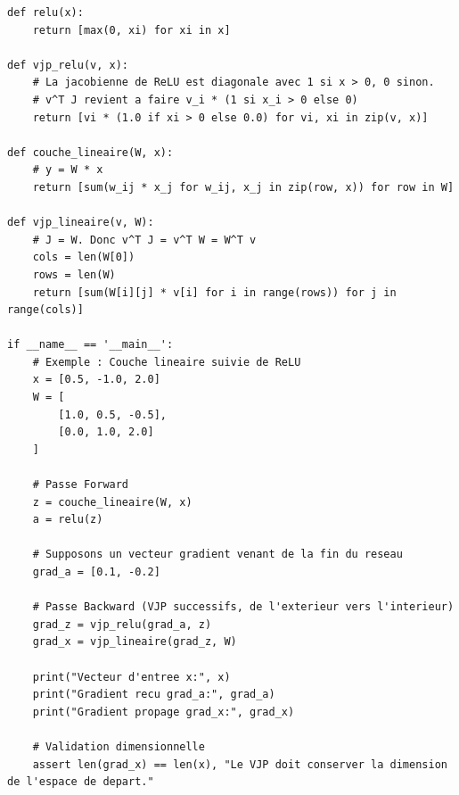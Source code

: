 \documentclass[11pt,a4paper]{article}
\begin{document}
\begin{lstlisting}
def relu(x):
    return [max(0, xi) for xi in x]

def vjp_relu(v, x):
    # La jacobienne de ReLU est diagonale avec 1 si x > 0, 0 sinon.
    # v^T J revient a faire v_i * (1 si x_i > 0 else 0)
    return [vi * (1.0 if xi > 0 else 0.0) for vi, xi in zip(v, x)]

def couche_lineaire(W, x):
    # y = W * x
    return [sum(w_ij * x_j for w_ij, x_j in zip(row, x)) for row in W]

def vjp_lineaire(v, W):
    # J = W. Donc v^T J = v^T W = W^T v
    cols = len(W[0])
    rows = len(W)
    return [sum(W[i][j] * v[i] for i in range(rows)) for j in range(cols)]

if __name__ == '__main__':
    # Exemple : Couche lineaire suivie de ReLU
    x = [0.5, -1.0, 2.0]
    W = [
        [1.0, 0.5, -0.5],
        [0.0, 1.0, 2.0]
    ]

    # Passe Forward
    z = couche_lineaire(W, x)
    a = relu(z)

    # Supposons un vecteur gradient venant de la fin du reseau
    grad_a = [0.1, -0.2]

    # Passe Backward (VJP successifs, de l'exterieur vers l'interieur)
    grad_z = vjp_relu(grad_a, z)
    grad_x = vjp_lineaire(grad_z, W)

    print("Vecteur d'entree x:", x)
    print("Gradient recu grad_a:", grad_a)
    print("Gradient propage grad_x:", grad_x)

    # Validation dimensionnelle
    assert len(grad_x) == len(x), "Le VJP doit conserver la dimension de l'espace de depart."
\end{lstlisting}

\newpage
\end{document}
